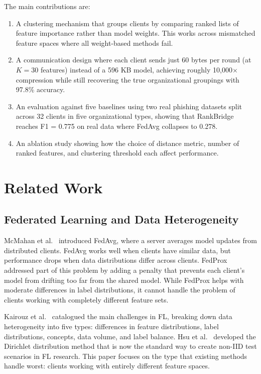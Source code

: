 \documentclass[12pt,a4paper]{article}
\begin{document}
The main contributions are:

\begin{enumerate}[leftmargin=*]
  \item A clustering mechanism that groups clients by comparing ranked lists of feature importance rather than model weights. This works across mismatched feature spaces where all weight-based methods fail.
  \item A communication design where each client sends just 60 bytes per round (at $K=30$ features) instead of a 596 KB model, achieving roughly 10{,}000$\times$ compression while still recovering the true organizational groupings with 97.8\% accuracy.
  \item An evaluation against five baselines using two real phishing datasets split across 32 clients in five organizational types, showing that RankBridge reaches F1 = 0.775 on real data where FedAvg collapses to 0.278.
  \item An ablation study showing how the choice of distance metric, number of ranked features, and clustering threshold each affect performance.
\end{enumerate}

\section{Related Work}\label{sec:related}

\subsection{Federated Learning and Data Heterogeneity}

McMahan et al.~\cite{mcmahan2017communication} introduced FedAvg, where a server averages model updates from distributed clients. FedAvg works well when clients have similar data, but performance drops when data distributions differ across clients. FedProx~\cite{li2020fedprox} addressed part of this problem by adding a penalty that prevents each client's model from drifting too far from the shared model. While FedProx helps with moderate differences in label distributions, it cannot handle the problem of clients working with completely different feature sets.

Kairouz et al.~\cite{kairouz2021advances} catalogued the main challenges in FL, breaking down data heterogeneity into five types: differences in feature distributions, label distributions, concepts, data volume, and label balance. Hsu et al.~\cite{hsu2019measuring} developed the Dirichlet distribution method that is now the standard way to create non-IID test scenarios in FL research. This paper focuses on the type that existing methods handle worst: clients working with entirely different feature spaces.
\end{document}
